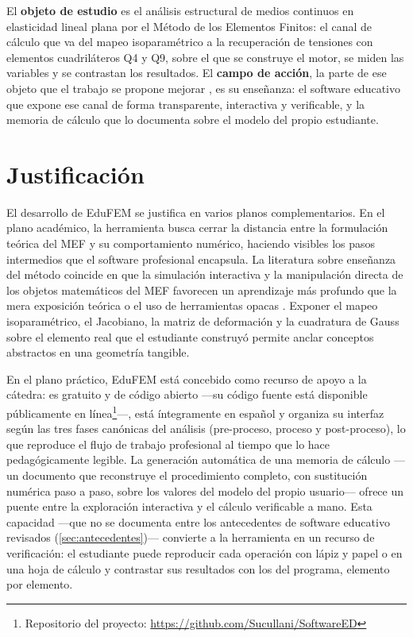 El \textbf{objeto de estudio} \autocite{alvarez_metodologia} es el análisis estructural de medios continuos en elasticidad lineal plana por el Método de los Elementos Finitos: el canal de cálculo que va del mapeo isoparamétrico a la recuperación de tensiones con elementos cuadriláteros Q4 y Q9, sobre el que se construye el motor, se miden las variables y se contrastan los resultados. El \textbf{campo de acción}, la parte de ese objeto que el trabajo se propone mejorar \autocite{alvarez_metodologia}, es su enseñanza: el software educativo que expone ese canal de forma transparente, interactiva y verificable, y la memoria de cálculo que lo documenta sobre el modelo del propio estudiante.

\section*{Justificación}

El desarrollo de EduFEM se justifica en varios planos complementarios. En el plano académico, la herramienta busca cerrar la distancia entre la formulación teórica del MEF y su comportamiento numérico, haciendo visibles los pasos intermedios que el software profesional encapsula. La literatura sobre enseñanza del método coincide en que la simulación interactiva y la manipulación directa de los objetos matemáticos del MEF favorecen un aprendizaje más profundo que la mera exposición teórica o el uso de herramientas opacas \autocite{lee2015interactive,lee2015eigenmodes,bishay2020teaching}. Exponer el mapeo isoparamétrico, el Jacobiano, la matriz de deformación y la cuadratura de Gauss sobre el elemento real que el estudiante construyó permite anclar conceptos abstractos en una geometría tangible.

En el plano práctico, EduFEM está concebido como recurso de apoyo a la cátedra: es gratuito y de código abierto —su código fuente está disponible públicamente en línea\footnote{Repositorio del proyecto: \url{https://github.com/Sucullani/SoftwareED}}—, está íntegramente en español y organiza su interfaz según las tres fases canónicas del análisis (pre-proceso, proceso y post-proceso), lo que reproduce el flujo de trabajo profesional al tiempo que lo hace pedagógicamente legible. La generación automática de una memoria de cálculo —un documento que reconstruye el procedimiento completo, con sustitución numérica paso a paso, sobre los valores del modelo del propio usuario— ofrece un puente entre la exploración interactiva y el cálculo verificable a mano. Esta capacidad —que no se documenta entre los antecedentes de software educativo revisados (\autoref{sec:antecedentes})— convierte a la herramienta en un recurso de verificación: el estudiante puede reproducir cada operación con lápiz y papel o en una hoja de cálculo y contrastar sus resultados con los del programa, elemento por elemento.

